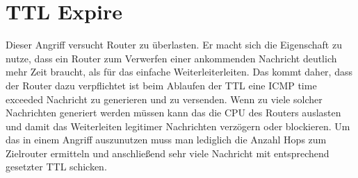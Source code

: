\section{TTL Expire}

Dieser Angriff versucht Router zu überlasten. Er macht sich die Eigenschaft zu nutze, dass ein Router zum Verwerfen einer ankommenden Nachricht deutlich mehr Zeit braucht, als für das einfache Weiterleiterleiten. Das kommt daher, dass der Router dazu verpflichtet ist beim Ablaufen der TTL eine ICMP time exceeded Nachricht zu generieren und zu versenden. Wenn zu viele solcher Nachrichten generiert werden müssen kann das die CPU des Routers auslasten und damit das Weiterleiten legitimer Nachrichten verzögern oder blockieren. Um das in einem Angriff auszunutzen muss man lediglich die Anzahl Hops zum Zielrouter ermitteln und anschließend sehr viele Nachricht mit entsprechend gesetzter TTL schicken.